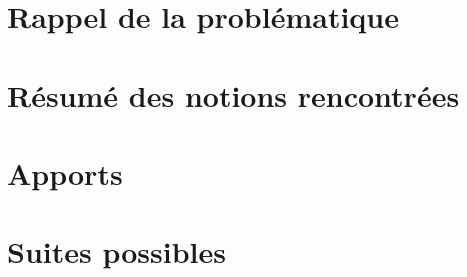 \section{Rappel de la problématique}

\section{Résumé des notions rencontrées}

\section{Apports}

\section{Suites possibles}
